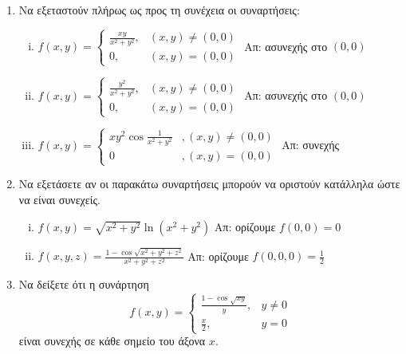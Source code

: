 \documentclass[a4paper,table]{report}
\begin{document}
\begin{enumerate}
  \item Να εξεταστούν πλήρως ως προς τη συνέχεια οι συναρτήσεις:
    \begin{enumerate}[(i)]
      \item $ f(x,y) = 
        \begin{cases}
          \frac{ xy }{ x^{2} + y^{2} } ,& (x,y)\neq (0,0) \\
          0 ,& (x,y)= (0,0)
        \end{cases} $
        \hfill Απ: ασυνεχής στο $ (0,0) $ 

      \item $ f(x,y) = 
        \begin{cases} 
          \frac{y^{2}}{x^{2}+y^{2}}, & (x,y) 
          \neq (0,0) \\ 0, & (x,y) = (0,0)
        \end{cases} $
        \hfill Απ: ασυνεχής στο $ (0,0) $ 

      \item $ f(x,y)=
        \begin{cases}
          xy^{2}\cos \frac{1}{x^{2}+y^{2}} &, (x,y)\neq (0,0)\\
          0 &, (x,y)=(0,0)
        \end{cases}
        $ \hfill Απ: συνεχής
    \end{enumerate}

  \item Να εξετάσετε αν οι παρακάτω συναρτήσεις μπορούν να οριστούν κατάλληλα ώστε 
    να είναι συνεχείς.
    \begin{enumerate}[(i)]
      \item $ f(x,y) = \sqrt{x^{2}+y^{2}} \ln{(x^{2}+y^{2})} $ 
        \hfill Απ: ορίζουμε $ f(0,0)=0 $ 
      \item $ f(x,y,z) = \frac{1-\cos{\sqrt{x^{2}+y^{2}+z^{2}}}}{x^{2}+y^{2}+z^{2}}$ 
        \hfill Απ: ορίζουμε $ f(0,0,0) = \frac{1}{2} $ 
    \end{enumerate}

  \item Να δείξετε ότι η συνάρτηση 
    \[
      f(x,y) = 
      \begin{cases}
        \frac{1- \cos{\sqrt{xy}}}{y}, & y \neq 0 \\ \frac{x}{2}, & y = 0  
      \end{cases}
    \] 
    είναι συνεχής σε κάθε σημείο του άξονα $ x $.
\end{enumerate}
\end{document}
